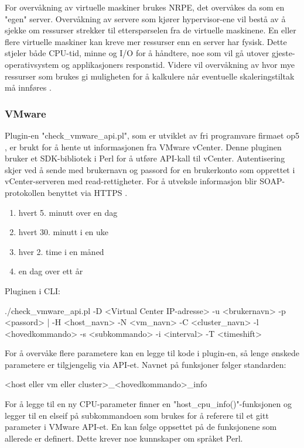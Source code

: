 For overvåkning av virtuelle maskiner brukes NRPE, det overvåkes da som en "egen" server. Overvåkning av servere som kjører hypervisor-ene vil bestå av å sjekke om ressurser strekker til etterspørselen fra de virtuelle maskinene. En eller flere virtuelle maskiner kan kreve mer ressurser enn en server har fysisk. Dette stjeler både CPU-tid, minne og I/O for å håndtere, noe som vil gå utover gjeste-operativsystem og applikasjoners responstid. Videre vil overvåkning av hvor mye ressurser som brukes gi muligheten for å kalkulere når eventuelle skaleringstiltak må innføres \cite{vmwaremonitoring}. 

\subsubsection{VMware}

Plugin-en "check\_vmware\_api.pl", som er utviklet av fri programvare firmaet op5 \cite{op5}, er brukt for å hente ut informasjonen fra VMware vCenter. Denne pluginen bruker et SDK-bibliotek i Perl \cite{vmwareperl} for å utføre API-kall til vCenter. Autentisering skjer ved å sende med brukernavn og passord for en brukerkonto som opprettet i vCenter-serveren med read-rettigheter. For å utveksle informasjon blir SOAP-protokollen benyttet \cite{wiki:soap} via HTTPS \cite{ciscovirtual}. 
\begin{enumerate}
	\item hvert 5. minutt over en dag 
	\item hvert 30. minutt i en uke
	\item hver 2. time i en måned
	\item en dag over ett år
\end{enumerate}

Pluginen i CLI:


./check\_vmware\_api.pl -D <Virtual Center IP-adresse> -u <brukernavn> -p <passord> | -H <host\_navn> -N <vm\_navn> -C <cluster\_navn>  -l <hovedkommando> -s <subkommando> -i <interval> -T <timeshift>

For å overvåke flere parametere kan en legge til kode i plugin-en, så lenge ønskede parametere er tilgjengelig via API-et. Navnet på funksjoner følger standarden:

<host eller vm eller cluster>\_<hovedkommando>\_info 

For å legge til en ny CPU-parameter finner en "host\_cpu\_info()"-funksjonen og legger til en elseif på subkommandoen som brukes for å referere til et gitt parameter i VMware API-et. En kan følge oppsettet på de funksjonene som allerede er definert. Dette krever noe kunnskaper om språket Perl.

